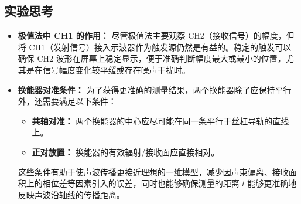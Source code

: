 \documentclass[10pt, twocolumn]{article}
\begin{document}
\subsection{实验思考}
\begin{itemize}
    \item \textbf{极值法中 CH1 的作用：} 尽管极值法主要观察 CH2（接收信号）的幅度，但将 CH1（发射信号）接入示波器作为触发源仍然是有益的。稳定的触发可以确保 CH2 波形在屏幕上稳定显示，便于准确判断幅度最大或最小的位置，尤其是在信号幅度变化较平缓或存在噪声干扰时。
    \item \textbf{换能器对准条件：} 为了获得更准确的测量结果，两个换能器除了应保持平行外，还需要满足以下条件：
        \begin{itemize}
            \item \textbf{共轴对准：} 两个换能器的中心应尽可能在同一条平行于丝杠导轨的直线上。
            \item \textbf{正对放置：} 换能器的有效辐射/接收面应直接相对。
        \end{itemize}
    这些条件有助于使声波传播更接近理想的一维模型，减少因声束偏离、接收面积上的相位差等因素引入的误差，同时也能够确保测量的距离 $l$ 能够更准确地反映声波沿轴线的传播距离。
\end{itemize}
\end{document}
